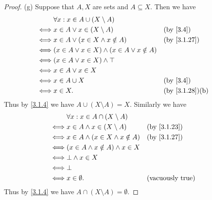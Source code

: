 \begin{proof}{(g)}
  Suppose that \(A, X\) are sets and \(A \subseteq X\).
  Then we have
  \begin{align*}
         & \forall x : x \in A \cup (X \setminus A)                                                 \\
    \iff & x \in A \lor x \in (X \setminus A)                     &  & \by{3.4}                     \\
    \iff & x \in A \lor (x \in X \land x \notin A)                &  & \by{3.1.27}                  \\
    \iff & (x \in A \lor x \in X) \land (x \in A \lor x \notin A)                                   \\
    \iff & (x \in A \lor x \in X) \land \top                                                        \\
    \iff & x \in A \lor x \in X                                                                     \\
    \iff & x \in A \cup X                                         &  & \by{3.4}                     \\
    \iff & x \in X.                                               &  & \text{(by \cref{3.1.28})(b)}
  \end{align*}
  Thus by \cref{3.1.4} we have \(A \cup (X \setminus A) = X\).
  Similarly we have
  \begin{align*}
         & \forall x : x \in A \cap (X \setminus A)                              \\
    \iff & x \in A \land x \in (X \setminus A)      &  & \by{3.1.23}             \\
    \iff & x \in A \land (x \in X \land x \notin A) &  & \by{3.1.27}             \\
    \iff & (x \in A \land x \notin A) \land x \in X                              \\
    \iff & \bot \land x \in X                                                    \\
    \iff & \bot                                                                  \\
    \iff & x \in \emptyset.                         &  & \text{(vacuously true)}
  \end{align*}
  Thus by \cref{3.1.4} we have \(A \cap (X \setminus A) = \emptyset\).
\end{proof}

